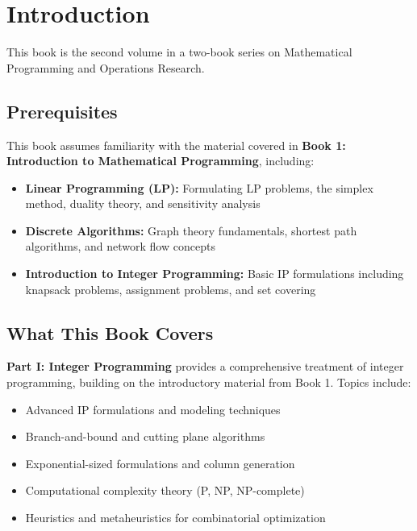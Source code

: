 
\chapter*{Introduction}

This book is the second volume in a two-book series on Mathematical Programming and Operations Research.

\section*{Prerequisites}

This book assumes familiarity with the material covered in \textbf{Book 1: Introduction to Mathematical Programming}, including:

\begin{itemize}
    \item \textbf{Linear Programming (LP):} Formulating LP problems, the simplex method, duality theory, and sensitivity analysis
    \item \textbf{Discrete Algorithms:} Graph theory fundamentals, shortest path algorithms, and network flow concepts
    \item \textbf{Introduction to Integer Programming:} Basic IP formulations including knapsack problems, assignment problems, and set covering
\end{itemize}

\section*{What This Book Covers}

\textbf{Part I: Integer Programming} provides a comprehensive treatment of integer programming, building on the introductory material from Book 1. Topics include:
\begin{itemize}
    \item Advanced IP formulations and modeling techniques
    \item Branch-and-bound and cutting plane algorithms
    \item Exponential-sized formulations and column generation
    \item Computational complexity theory (P, NP, NP-complete)
    \item Heuristics and metaheuristics for combinatorial optimization
\end{itemize}

